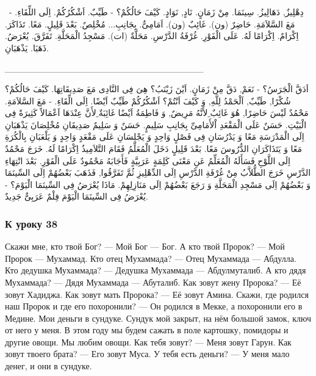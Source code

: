 \documentclass[a5paper]{article}
\begin{document}
\ دِهْلِيزٌ, دَهَالِيزُ. سِينَمَا. مِنْ زَمَانٍ. نَادٍ, نَوَادٍ. كَيْفَ حَالُكُمْ؟ - طَيِّبٌ. اَشْكُرُكُمْ. اِلَى اللِّقَاءِ. - مَعَ السَّلاَمَةِ. حَاضِرٌ (ون). غَائِبٌ (ون). اَمَامِىٌّ. بِجَانِبِ... مُخْلِصٌ. بَعْدَ قَلِيلٍ. مَعًا. تَذَاكَرَ. اِكْرَامٌ. اِكْرَامًا لَهُ. عَلَى الْفَوْرِ. غُرْفَةُ الدَّرْسِ. مَحَلَّةٌ (ات). مَسْجِدُ الْمَحَلَّةِ. تَفَرَّقَ. يُعْرَضُ. ذَهَبَا. يَذْهَبَانِ.

\_\_\_\_\_\_\_\_\_\_\_\_\_\_\_\_\_\_\_\_\_\_\_\_\_\_\_\_\_\_\_

اَدَقَّ الْجَرَسُ؟ - نَعَمْ, دَقَّ مِنْ زَمَانٍ. اَيْنَ زَيْنَبُ؟ هِىَ فِى النَّادِى مَعَ صَدِيقَاتِهَا. كَيْفَ حَالُكُمْ؟ شُكْرًا, طَيِّبٌ, اَلْحَمْدُ لِلَّهِ, وَ كَيْفَ اَنْتُمْ؟ اَشْكُرُكُمْ طَيِّبٌ اَيْضًا. اِلَى الِّقَاءِ. - مَعَ السَّلاَمَةِ. مَحْمُدٌ لَيْسَ حَاضِرًا, هُوَ غَائِبٌ ِلأَنَّهُ مَرِيضٌ, وَ فَاطِمَةُ اَيْضًا غَائِبَةٌ ِلأَنَّ عِنْدَهَا اَعْمَالاً كَثِيرَةً فِى الْبَيْتِ. حَسَنٌ عَلَى الْمَقْعَدِ اْلأَمَامِىِّ بِجَانِبِ سَلِيمٍ. حَسَنٌ وَ سَلِيمٌ صَدِيقَانِ مُخْلِصَانَ يَذْهَبَانِ اِلَى الْمَدْرَسَةِ مَعًا وَ يَدْرُسَانِ فِى فَصْلٍ وَاحِدٍ وَ يَجْلِسَانِ عَلَى مَقْعَدٍ وَاحِدٍ وَ يَلْعَبَانِ بِالْكُرَةِ مَعًا وَ يَتَذَاكَرَانِ الدُّرُوسَ مَعًا. بَعْدَ قَلِيلٍ دَخَلَ الْمُعَلِّمُ فَقَامَ التَّلاَمِيذُ اِكْرَامًا لَهُ. خَرَجَ مَحْمُدٌ اِلَى اللَّوْحِ فَسَأَلَهُ الْمُعَلِّمُ عَنِ مَعْنَى كَلِمَةٍ عَرَبِيَّةٍ فَأَجَابَهُ مَحْمُودٌ عَلَى الْفَوْرِ. بَعْدَ انْتِهَاءِ الدَّرْسِ خَرَجَ الطُّلاَّبُ مِنْ غُرْفَةِ الدَّرْسِ اِلَى الدِّهْلِيزِ ثُمَّ تَفَرَّقُوا, فَذَهَبَ بَعْضُهُمْ اِلَى السِّينَمَا وَ بَعْضُهُمْ اِلَى مَسْجِدِ الْمَحَلَّةِ وَ رَجَعَ بَعْضُهُمْ اِلَى مَنَازِلِهِمْ. مَاذَا يُعْرَضُ فِى السِّينَمَا الْيَوْمَ؟ - يُعْرَضُ فِى السِّينَمَا الْيَوْمَ فِلْمٌ عَرَبِىٌّ جَدِيدٌ.

\subsubsection{К уроку 38}
Скажи мне, кто твой Бог? — Мой Бог — Бог. А кто твой Про­рок? — Мой Пророк — Мухаммад. Кто отец Мухаммада? — Отец Мухаммада — Абдулла. Кто дедушка Мухаммада? — Дедушка Мухаммада — Абдулмуталиб. А кто дядя Мухаммада? — Дядя Мухаммада — Абуталиб. Как зовут жену Пророка? — Её зовут Хадиджа. Как зовут мать Пророка? — Её зовут Амина. Скажи, где родился наш Пророк и где его похоронили? — Он родился в Мекке, а похоронили его в Медине. Мои деньги в сундуке. Сундук мой закрыт, на нём большой замок, ключ от него у меня. В этом году мы будем сажать в поле картошку, помидоры и другие овощи. Мы любим овощи. Как тебя зовут? — Меня зовут Гарун. Как зовут твоего брата? — Его зовут Муса. У тебя есть деньги? — У меня мало денег, и они в сундуке.
\end{document}
